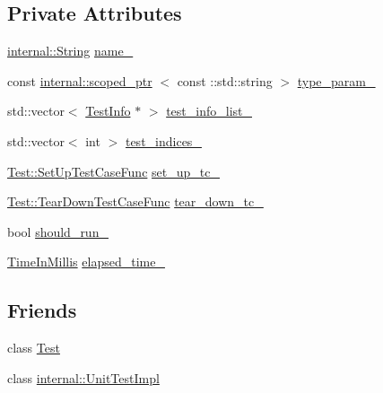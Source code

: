 \subsection*{\-Private \-Attributes}
\begin{DoxyCompactItemize}
\item 
\hyperlink{classtesting_1_1internal_1_1String}{internal\-::\-String} \hyperlink{classtesting_1_1TestCase_a405ae26bae83121bb8a0991436141b78}{name\-\_\-}
\item 
const \hyperlink{classtesting_1_1internal_1_1scoped__ptr}{internal\-::scoped\-\_\-ptr}\*
$<$ const \-::std\-::string $>$ \hyperlink{classtesting_1_1TestCase_a85fc352afd22204cc3515cb59a7d5b38}{type\-\_\-param\-\_\-}
\item 
std\-::vector$<$ \hyperlink{classtesting_1_1TestInfo}{\-Test\-Info} $\ast$ $>$ \hyperlink{classtesting_1_1TestCase_a65416ad78055a5f6a8ea21fa0ed8ac9c}{test\-\_\-info\-\_\-list\-\_\-}
\item 
std\-::vector$<$ int $>$ \hyperlink{classtesting_1_1TestCase_a01ce3b1011c9e64d1e78efe620dc00dc}{test\-\_\-indices\-\_\-}
\item 
\hyperlink{classtesting_1_1Test_a2df065892efeff7ca91bb2d2fbe00975}{\-Test\-::\-Set\-Up\-Test\-Case\-Func} \hyperlink{classtesting_1_1TestCase_a168acfe04861100ab0d0175d14b1fce7}{set\-\_\-up\-\_\-tc\-\_\-}
\item 
\hyperlink{classtesting_1_1Test_a4ae7a4e140c70dee5c9cb82e13ae570c}{\-Test\-::\-Tear\-Down\-Test\-Case\-Func} \hyperlink{classtesting_1_1TestCase_a152e0eba7294d5301d205822b0eae136}{tear\-\_\-down\-\_\-tc\-\_\-}
\item 
bool \hyperlink{classtesting_1_1TestCase_ade0e3d581d82aaeaf7263d575564cb40}{should\-\_\-run\-\_\-}
\item 
\hyperlink{namespacetesting_a338e9fd9474f0d8fafcb28b05f66a630}{\-Time\-In\-Millis} \hyperlink{classtesting_1_1TestCase_a97b9c166ebee95ae4c9ef26cf3155617}{elapsed\-\_\-time\-\_\-}
\end{DoxyCompactItemize}
\subsection*{\-Friends}
\begin{DoxyCompactItemize}
\item 
class \hyperlink{classtesting_1_1TestCase_ab085d1bf4cff8b1045750706b11f8662}{\-Test}
\item 
class \hyperlink{classtesting_1_1TestCase_aa684cc13a8f91b00c0c9ce41ec7474eb}{internal\-::\-Unit\-Test\-Impl}
\end{DoxyCompactItemize}


